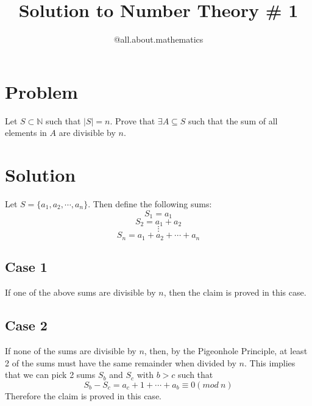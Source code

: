 \documentclass[12pt]{article}
\title{Solution to Number Theory \# 1}
\author{@all.about.mathematics}
\begin{document}
\maketitle
\section{Problem}
Let $S\subset\mathbb{N}$ such that $|S|=n$. Prove that $\exists A\subseteq S$ such that the sum of all elements in $A$ are divisible by $n$.
\section{Solution}
Let $S=\{a_1,a_2,\cdots,a_n\}$. 
Then define the following sums: $$S_1=a_1$$
$$S_2=a_1+a_2$$
$$\vdots$$
$$S_n=a_1+a_2+\cdots+a_n$$
\subsection{Case 1}
If one of the above sums are divisible by $n$, then the claim is proved in this case.
\subsection{Case 2}
If none of the sums are divisible by $n$, then, by the Pigeonhole Principle, at least 2 of the sums must have the same remainder when divided by $n$. This implies that we can pick 2 sums $S_b$ and $S_c$  with $b>c$ such that 
$$S_b-S_c=a_c+1+\cdots+a_b\equiv0(mod\:n)$$
Therefore the claim is proved in this case.
\end{document}

